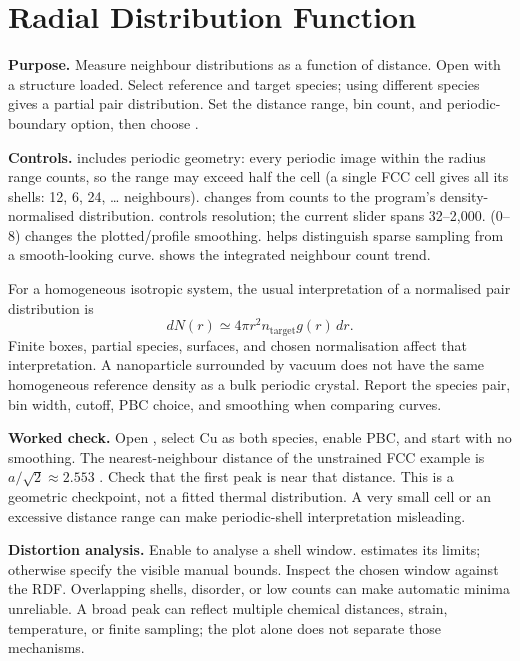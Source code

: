 \section{Radial Distribution Function}
\textbf{Purpose.} Measure neighbour distributions as a function of distance. Open  with a structure loaded. Select reference and target species; using different species gives a partial pair distribution. Set the distance range, bin count, and periodic-boundary option, then choose .

\textbf{Controls.}  includes periodic geometry: every periodic image within the radius range counts, so the range may exceed half the cell (a single FCC cell gives all its shells: 12, 6, 24, \ldots{} neighbours).  changes from counts to the program's density-normalised distribution.  controls resolution; the current slider spans 32--2,000.  (0--8) changes the plotted/profile smoothing.  helps distinguish sparse sampling from a smooth-looking curve.  shows the integrated neighbour count trend.

For a homogeneous isotropic system, the usual interpretation of a normalised pair distribution is
\[
dN(r)\simeq 4\pi r^2 n_{\mathrm{target}} g(r)\,dr.
\]
Finite boxes, partial species, surfaces, and chosen normalisation affect that interpretation. A nanoparticle surrounded by vacuum does not have the same homogeneous reference density as a bulk periodic crystal. Report the species pair, bin width, cutoff, PBC choice, and smoothing when comparing curves.

\textbf{Worked check.} Open , select Cu as both species, enable PBC, and start with no smoothing. The nearest-neighbour distance of the unstrained FCC example is $a/\sqrt{2}\approx2.553$ \angstrom. Check that the first peak is near that distance. This is a geometric checkpoint, not a fitted thermal distribution. A very small cell or an excessive distance range can make periodic-shell interpretation misleading.

\textbf{Distortion analysis.} Enable  to analyse a shell window.  estimates its limits; otherwise specify the visible manual bounds. Inspect the chosen window against the RDF. Overlapping shells, disorder, or low counts can make automatic minima unreliable. A broad peak can reflect multiple chemical distances, strain, temperature, or finite sampling; the plot alone does not separate those mechanisms.


